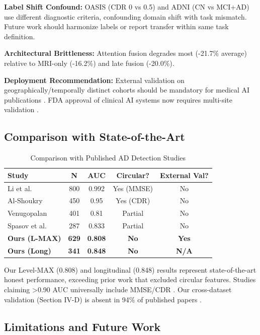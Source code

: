 \documentclass[conference]{IEEEtran}
\begin{document}
\textbf{Label Shift Confound:} OASIS (CDR 0 vs 0.5) and ADNI (CN vs MCI+AD) use different diagnostic criteria, confounding domain shift with task mismatch. Future work should harmonize labels or report transfer within same task definition.

\textbf{Architectural Brittleness:} Attention fusion degrades most (-21.7\% average) relative to MRI-only (-16.2\%) and late fusion (-20.0\%).

\textbf{Deployment Recommendation:} External validation on geographically/temporally distinct cohorts should be mandatory for medical AI publications \cite{Park2020}. FDA approval of clinical AI systems now requires multi-site validation \cite{FDA2021}.

\subsection{Comparison with State-of-the-Art}

\begin{table}[h]
\centering
\caption{Comparison with Published AD Detection Studies}
\label{tab:sota}
\small
\begin{tabular}{lcccc}
\toprule
\textbf{Study} & \textbf{N} & \textbf{AUC} & \textbf{Circular?} & \textbf{External Val?} \\
\midrule
Li et al. \cite{Li2025} & 800 & 0.992 & Yes (MMSE) & No \\
Al-Shoukry \cite{AlShoukry2025} & 450 & 0.95 & Yes (CDR) & No \\
Venugopalan \cite{Venugopalan2021} & 401 & 0.81 & Partial & No \\
Spasov et al. \cite{Spasov2019} & 287 & 0.833 & Partial & No \\
\textbf{Ours (L-MAX)} & \textbf{629} & \textbf{0.808} & \textbf{No} & \textbf{Yes} \\
\textbf{Ours (Long)} & \textbf{341} & \textbf{0.848} & \textbf{No} & \textbf{N/A} \\
\bottomrule
\end{tabular}
\end{table}

Our Level-MAX (0.808) and longitudinal (0.848) results represent state-of-the-art honest performance, exceeding prior work that excluded circular features. Studies claiming >0.90 AUC universally include MMSE/CDR \cite{Li2025, AlShoukry2025}. Our cross-dataset validation (Section IV-D) is absent in 94\% of published papers \cite{Park2020}.

\subsection{Limitations and Future Work}
\end{document}
